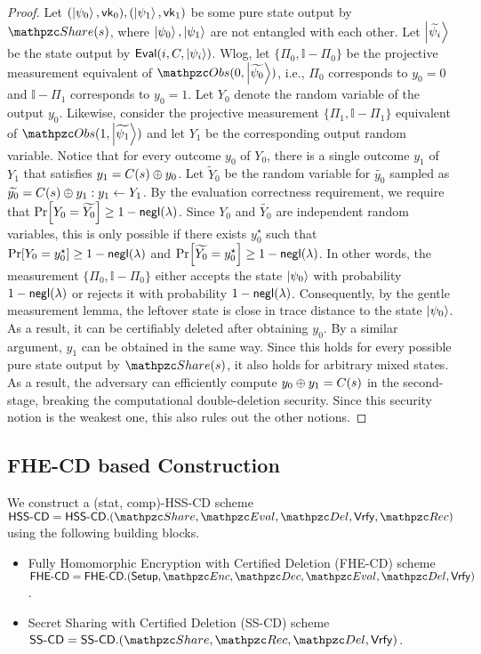 \begin{proof}
Let $(\ket{\psi_0}, \mathsf{vk}_0), (\ket{\psi_1}, \mathsf{vk}_1)$ be some pure
state output by $\Sh(s)$, where $\ket{\psi_0}, \ket{\psi_1}$ are not
entangled with each other. Let $\ket{\widetilde{\psi_i}}$ be the
state output by $\mathsf{Eval}(i, C, \ket{\psi_i})$.
Wlog, let $\{\Pi_0, \mathbb{I} - \Pi_0\}$
be the projective measurement equivalent of $\Obs(0,
\ket{\widetilde{\psi_0}})$, i.e., $\Pi_0$ corresponds to $y_0 = 0$
and $\mathbb{I} - \Pi_1$ corresponds to $y_0 = 1$. Let $Y_0$ denote
the random variable of the output $y_0$. Likewise, consider the
projective measurement $\{\Pi_1, \mathbb{I} - \Pi_1\}$ equivalent of
$\Obs(1, \ket{\widetilde{\psi_1}})$ and let $Y_1$ be the
corresponding output random variable. Notice that for every outcome
$y_0$ of $Y_0$, there is a single outcome $y_1$ of $Y_1$ that
satisfies $y_1 = C(s) \oplus y_0$. Let $\widetilde{Y}_0$ be the random
variable for $\widetilde{y_0}$ sampled as $\widetilde{y_0} = C(s)
\oplus y_1 : y_1 \leftarrow Y_1$. By the evaluation correctness
requirement, we require that $\Pr[Y_0 = \widetilde{Y_0}] \ge 1 -
{\mathsf{negl}}(\lambda)$.  Since $Y_0$ and $\widetilde{Y_0}$ are independent
random variables, this is only possible if there exists $y_0^\star$
such that $\Pr[Y_0 = y_0^\star] \geq 1 - {\mathsf{negl}}(\lambda)$ and
$\Pr[\widetilde{Y_0} = y_0^\star] \geq 1 - {\mathsf{negl}}(\lambda)$. In other
words, the measurement $\{\Pi_0, \mathbb{I} - \Pi_0\}$ either
accepts the state $\ket{\psi_0}$ with probability $1 - {\mathsf{negl}}(\lambda)$
or rejects it with probability $1 - {\mathsf{negl}}(\lambda)$. Consequently, by
the gentle measurement lemma, the leftover state is close in trace
distance to the state $\ket{\psi_0}$. As a result, it can be
certifiably deleted after obtaining $y_0$. By a similar argument,
$y_1$ can be obtained in the same way. Since this holds for every
possible pure state output by $\Sh(s)$, it also holds for arbitrary
mixed states. As a result, the adversary can efficiently compute
$y_0 \oplus y_1 = C(s)$ in the second-stage, breaking the
computational double-deletion security. Since this security notion
is the weakest one, this also rules out the other notions.
\end{proof}

\subsection{FHE-CD based Construction}

We construct a (stat, comp)-HSS-CD scheme
$\HSScd = \HSScd.(\Sh, \Ev, \Del, \Vrfy, \Rec)$ using the following
building blocks.

\begin{itemize}
\item Fully Homomorphic Encryption with Certified Deletion (FHE-CD)
scheme $\FHEcd = \FHEcd.(\Setup, \qEnc, \qDec, \\
\Ev, \Del, \Vrfy)$.

\item Secret Sharing with Certified Deletion (SS-CD) scheme $\SScd =
\SScd.(\Sh, \Rec, \Del, \Vrfy)$.
\end{itemize}


